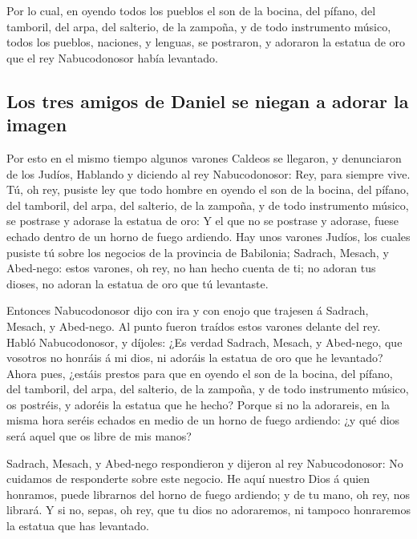  Por lo cual, en oyendo todos los pueblos el son de la
bocina, del pífano, del tamboril, del arpa, del salterio, de la zampoña,
y de todo instrumento músico, todos los pueblos, naciones, y lenguas, se
postraron, y adoraron la estatua de oro que el rey Nabucodonosor había
levantado.

\hypertarget{los-tres-amigos-de-daniel-se-niegan-a-adorar-la-imagen}{%
\subsection{Los tres amigos de Daniel se niegan a adorar la
imagen}\label{los-tres-amigos-de-daniel-se-niegan-a-adorar-la-imagen}}

 Por esto en el mismo tiempo algunos varones Caldeos se
llegaron, y denunciaron de los Judíos,  Hablando y
diciendo al rey Nabucodonosor: Rey, para siempre vive. 
Tú, oh rey, pusiste ley que todo hombre en oyendo el son de la bocina,
del pífano, del tamboril, del arpa, del salterio, de la zampoña, y de
todo instrumento músico, se postrase y adorase la estatua de oro:
 Y el que no se postrase y adorase, fuese echado dentro
de un horno de fuego ardiendo.  Hay unos varones Judíos,
los cuales pusiste tú sobre los negocios de la provincia de Babilonia;
Sadrach, Mesach, y Abed-nego: estos varones, oh rey, no han hecho cuenta
de ti; no adoran tus dioses, no adoran la estatua de oro que tú
levantaste.

 Entonces Nabucodonosor dijo con ira y con enojo que
trajesen á Sadrach, Mesach, y Abed-nego. Al punto fueron traídos estos
varones delante del rey.  Habló Nabucodonosor, y díjoles:
¿Es verdad Sadrach, Mesach, y Abed-nego, que vosotros no honráis á mi
dios, ni adoráis la estatua de oro que he levantado? 
Ahora pues, ¿estáis prestos para que en oyendo el son de la bocina, del
pífano, del tamboril, del arpa, del salterio, de la zampoña, y de todo
instrumento músico, os postréis, y adoréis la estatua que he hecho?
Porque si no la adorareis, en la misma hora seréis echados en medio de
un horno de fuego ardiendo: ¿y qué dios será aquel que os libre de mis
manos?

 Sadrach, Mesach, y Abed-nego respondieron y dijeron al
rey Nabucodonosor: No cuidamos de responderte sobre este negocio.
 He aquí nuestro Dios á quien honramos, puede librarnos
del horno de fuego ardiendo; y de tu mano, oh rey, nos librará.
 Y si no, sepas, oh rey, que tu dios no adoraremos, ni
tampoco honraremos la estatua que has levantado.


